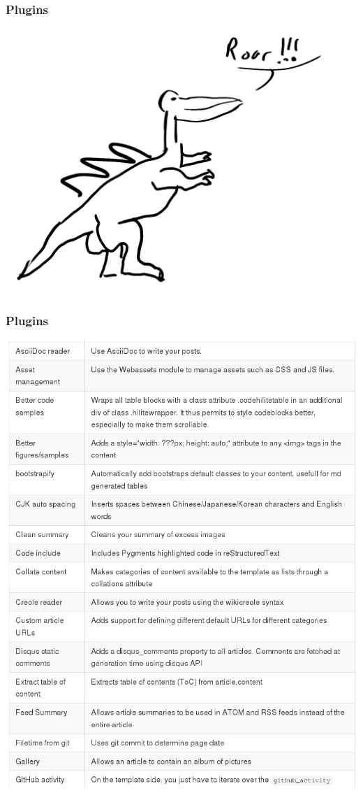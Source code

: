 \documentclass[frenchb,francais]{beamer}
\begin{document}
\begin{frame}
    \frametitle{Plugins}
    \begin{center}\includegraphics[scale=.12]{img/plugins.png}\end{center}
\end{frame}

\begin{frame}
    \frametitle{Plugins}
    \begin{center}\includegraphics[scale=.20]{img/plugin_list.png}\end{center}
\end{frame}
\end{document}
